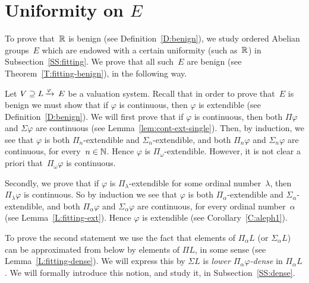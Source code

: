 \documentclass[main.tex]{subfiles}
\begin{document}
\section{Uniformity on $E$}
\label{S:unif}
To prove that~$\mathbb{R}$
is benign (see Definition~\ref{D:benign}),
we study
ordered Abelian groups~$E$ which are endowed with
a certain uniformity (such as~$\mathbb{R}$)
in Subsection~\ref{SS:fitting}.
We prove that all such~$E$ are benign
(see Theorem~\ref{T:fitting-benign}),
in the following way.

Let $V \supseteq L\,\smash{\xrightarrow{\varphi}\,E}$ be a valuation system.
Recall that in order to prove that~$E$ is benign
 we must show that 
if $\varphi$ is continuous,
then $\varphi$ is extendible (see Definition~\ref{D:benign}).
We will first prove that
if $\varphi$ is continuous,
then both $\Pi \varphi$ and $\Sigma \varphi$ are continuous
(see Lemma~\ref{lem:cont-ext-single}).
Then, by induction,
we see that $\varphi$ is
 both $\Pi_n$-extendible and $\Sigma_n$-extendible,
and both $\Pi_n\varphi$  and $\Sigma_n \varphi$
are continuous,
for every~$n\in \mathbb{N}$.
Hence $\varphi$ is $\Pi_\omega$-extendible.
However,
it is not clear a priori that~$\Pi_\omega\varphi$
is continuous.

Secondly,
we prove that if 
$\varphi$ is $\Pi_\lambda$-extendible
for some ordinal number~$\lambda$,
then $\Pi_\lambda\varphi$ is continuous.
So by induction
we see that $\varphi$ is both $\Pi_\alpha$-extendible
and $\Sigma_\alpha$-extendible,
and both $\Pi_\alpha\varphi$ and $\Sigma_\alpha\varphi$
are continuous,
for every ordinal number~$\alpha$ 
(see Lemma~\ref{L:fitting-ext}).
Hence $\varphi$ is extendible
(see Corollary~\ref{C:aleph1}).

To prove the second statement
we use the fact that
elements of $\Pi_\alpha L$ (or $\Sigma_\alpha L$)
can be approximated from below
by elements of $\Pi L$, in some sense
(see Lemma~\ref{L:fitting-dense}).
We will express this by
$\Sigma L$ is \emph{lower $\Pi_\alpha \varphi$-dense}
in $\Pi_\alpha L$.
We will formally introduce this notion,
and study it, in Subsection~\ref{SS:dense}.
\end{document}
